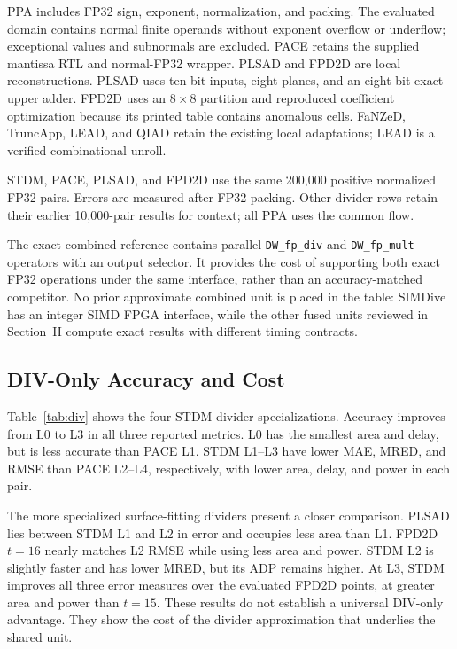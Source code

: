 \documentclass[conference]{IEEEtran}
\begin{document}
PPA includes FP32 sign, exponent, normalization, and packing.
The evaluated domain contains normal finite operands without exponent
overflow or underflow; exceptional values and subnormals are excluded.
PACE retains the supplied mantissa RTL and normal-FP32 wrapper.
PLSAD and FPD2D are local reconstructions. PLSAD uses ten-bit inputs,
eight planes, and an eight-bit exact upper adder. FPD2D uses an $8\times8$
partition and reproduced coefficient optimization because its printed table
contains anomalous cells. FaNZeD, TruncApp, LEAD, and QIAD retain the
existing local adaptations; LEAD is a verified combinational unroll.

STDM, PACE, PLSAD, and FPD2D use the same 200,000 positive normalized
FP32 pairs. Errors are measured after FP32 packing. Other divider rows
retain their earlier 10,000-pair results for context; all PPA uses the
common flow.

The exact combined reference contains parallel \texttt{DW\_fp\_div} and
\texttt{DW\_fp\_mult} operators with an output selector. It provides the cost
of supporting both exact FP32 operations under the same interface, rather than
an accuracy-matched competitor. No prior approximate combined unit is placed
in the table: SIMDive has an integer SIMD FPGA interface, while the other fused
units reviewed in Section~II compute exact results with different timing
contracts.

\subsection{DIV-Only Accuracy and Cost}
Table~\ref{tab:div} shows the four STDM divider specializations.
Accuracy improves from L0 to L3 in all three reported metrics.
L0 has the smallest area and delay, but is less accurate than PACE L1.
STDM L1--L3 have lower MAE, MRED, and RMSE than PACE L2--L4,
respectively, with lower area, delay, and power in each pair.

The more specialized surface-fitting dividers present a closer comparison.
PLSAD lies between STDM L1 and L2 in error and occupies less area than L1.
FPD2D $t=16$ nearly matches L2 RMSE while using less area and power.
STDM L2 is slightly faster and has lower MRED, but its ADP remains higher.
At L3, STDM improves all three error measures over the evaluated FPD2D
points, at greater area and power than $t=15$.
These results do not establish a universal DIV-only advantage.
They show the cost of the divider approximation that underlies the shared unit.
\end{document}
